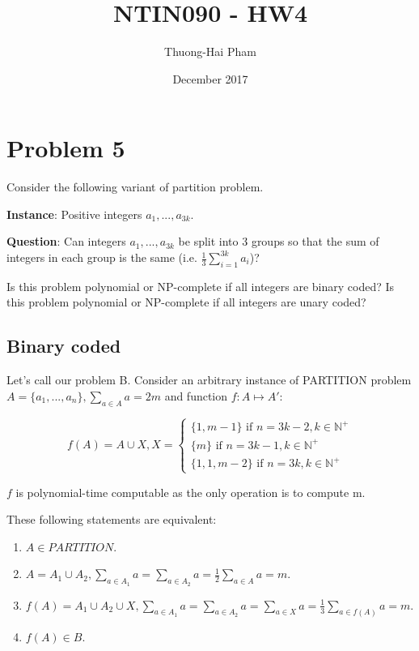 \documentclass{article}
\title{NTIN090 - HW4}
\author{Thuong-Hai Pham}
\date{December 2017}
\begin{document}
\maketitle

\section{Problem 5}
Consider the following variant of partition problem.

\textbf{Instance}: Positive integers $a_1,...,a_{3k}$.

\textbf{Question}: Can integers $a_1,...,a_{3k}$ be split into 3 groups so that the sum of integers in each group is the same (i.e. $\frac{1}{3}\sum_{i=1}^{3k}a_i$)?

Is this problem polynomial or NP-complete if all integers are binary coded? Is this problem polynomial or NP-complete if all integers are unary coded?

\subsection{Binary coded}

Let's call our problem B. Consider an arbitrary instance of PARTITION problem $A=\{a_1,...,a_n\}, \sum_{a\in A}a=2m$ and function $f: A \mapsto A'$:

\[f(A)=A\cup X, X=\begin{cases}
                    \{1,m-1\} \text{ if } n=3k-2,k\in \mathbb{N^+} \\
                    \{m\} \text{ if } n=3k-1,k\in \mathbb{N^+} \\
                    \{1,1,m-2\} \text{ if } n=3k,k\in \mathbb{N^+}
                \end{cases}\]

$f$ is polynomial-time computable as the only operation is to compute m.

These following statements are equivalent:
\begin{enumerate}
    \item $A\in PARTITION$.
    \item $A=A_1\cup A_2,\sum_{a\in A_1}a=\sum_{a\in A_2}a=\frac{1}{2}\sum_{a\in A}a=m$.
    \item $f(A) = A_1\cup A_2\cup X, \sum_{a\in A_1}a=\sum_{a\in A_2}a=\sum_{a\in X}a=\frac{1}{3}\sum_{a\in f(A)}a=m$.
    \item $f(A) \in B$.
\end{enumerate}
\end{document}
